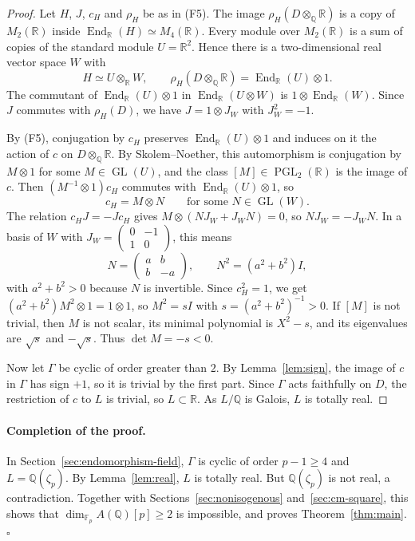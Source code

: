 \documentclass[11pt]{article}
\newcommand{\Q}{\mathbb Q}
\newcommand{\F}{\mathbb F}
\newcommand{\R}{\mathbb R}
\DeclareMathOperator{\End}{End}
\DeclareMathOperator{\GL}{GL}
\DeclareMathOperator{\PGL}{PGL}
\begin{document}
\begin{proof}
Let \(H\), \(J\), \(c_H\) and \(\rho_H\) be as in (F5). The image
\(\rho_H(D\otimes_{\Q}\R)\) is a copy of \(M_2(\R)\) inside
\(\End_{\R}(H)\simeq M_4(\R)\). Every module over \(M_2(\R)\) is a sum
of copies of the standard module \(U=\R^2\). Hence there is a
two-dimensional real vector space \(W\) with
\[
 H\simeq U\otimes_{\R}W,\qquad
 \rho_H(D\otimes_{\Q}\R)=\End_{\R}(U)\otimes1.
\]
The commutant of \(\End_{\R}(U)\otimes1\) in \(\End_{\R}(U\otimes W)\)
is \(1\otimes\End_{\R}(W)\). Since \(J\) commutes with \(\rho_H(D)\),
we have \(J=1\otimes J_W\) with \(J_W^2=-1\).

By (F5), conjugation by \(c_H\) preserves \(\End_{\R}(U)\otimes1\) and
induces on it the action of \(c\) on \(D\otimes_{\Q}\R\). By
Skolem--Noether, this automorphism is conjugation by \(M\otimes1\) for
some \(M\in\GL(U)\), and the class \([M]\in\PGL_2(\R)\) is the image of
\(c\). Then \((M^{-1}\otimes1)c_H\) commutes with
\(\End_{\R}(U)\otimes1\), so
\[
 c_H=M\otimes N\qquad\text{for some }N\in\GL(W).
\]
The relation \(c_HJ=-Jc_H\) gives \(M\otimes(NJ_W+J_WN)=0\), so
\(NJ_W=-J_WN\). In a basis of \(W\) with
\(J_W=\left(\begin{smallmatrix}0&-1\\1&0\end{smallmatrix}\right)\),
this means
\[
 N=\begin{pmatrix}a&b\\b&-a\end{pmatrix},\qquad N^2=(a^2+b^2)I,
\]
with \(a^2+b^2>0\) because \(N\) is invertible. Since \(c_H^2=1\), we
get \((a^2+b^2)M^2\otimes1=1\otimes1\), so \(M^2=sI\) with
\(s=(a^2+b^2)^{-1}>0\). If \([M]\) is not trivial, then \(M\) is not
scalar, its minimal polynomial is \(X^2-s\), and its eigenvalues are
\(\sqrt s\) and \(-\sqrt s\). Thus \(\det M=-s<0\).

Now let \(\Gamma\) be cyclic of order greater than \(2\). By
Lemma~\ref{lem:sign}, the image of \(c\) in \(\Gamma\) has sign \(+1\),
so it is trivial by the first part. Since \(\Gamma\) acts faithfully on
\(D\), the restriction of \(c\) to \(L\) is trivial, so
\(L\subset\R\). As \(L/\Q\) is Galois, \(L\) is totally real.
\end{proof}

\paragraph{Completion of the proof.}
In Section~\ref{sec:endomorphism-field}, \(\Gamma\) is cyclic of order
\(p-1\geq4\) and \(L=\Q(\zeta_p)\). By Lemma~\ref{lem:real}, \(L\) is
totally real. But \(\Q(\zeta_p)\) is not real, a contradiction.
Together with Sections~\ref{sec:nonisogenous} and~\ref{sec:cm-square},
this shows that \(\dim_{\F_p}A(\Q)[p]\geq2\) is impossible, and proves
Theorem~\ref{thm:main}.
\hfill\(\square\)
\end{document}
